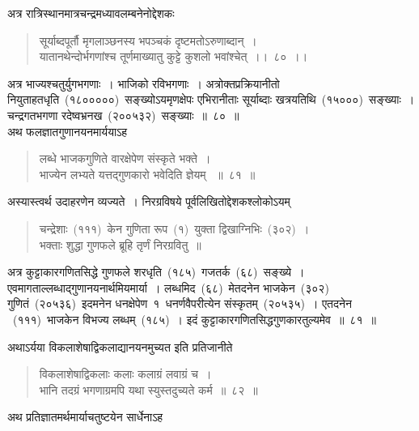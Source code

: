 \documentclass[11pt, openany]{book}
\begin{document}
\indent
अत्र रात्रिस्थानमात्रचन्द्रमध्यावलम्बनेनोद्देशकः\textendash

\begin{quote}
{\ku सूर्याब्दपूर्तौ मृगलाञ्छनस्य भपञ्चकं दृष्टमतोऽरुणाब्दान्~।\\
यातानथेन्दोर्भगणांश्च तूर्णमाख्यातु कुट्टे कुशलो भवांश्चेत्~।।~८०~।।}
\end{quote}

\indent
अत्र भाज्यश्चतुर्युगभगणाः~। भाजिको रविभगणाः~। अत्रोक्तप्रक्रियानीतो नियुताहतधृति~(१८०००००)~सङ्ख्योऽयमृणक्षेपः एभिरानीताः सूर्याब्दाः खत्रयतिथि~(१५०००)~सङ्ख्याः~। चन्द्रगतभगणा रदेष्वभ्रनख~(२००५३२)~सङ्ख्याः~॥~८०~॥\\

\indent
अथ फलज्ञातगुणानयनमार्ययाऽह\textendash

\begin{quote}
{\ks लब्धे भाजकगुणिते वारक्षेपेण संस्कृते भक्ते~।\\
भाज्येन लभ्यते यत्तद्गुणकारो भवेदिति ज्ञेयम् ~॥~८१~॥}
\end{quote}

\indent
अस्यास्त्वर्थ उदाहरणेन व्यज्यते~। निरग्रविषये पूर्वलिखितोद्देशकश्लोकोऽयम्\textendash

\begin{quote}
{\qt चन्द्रेशाः~(१११)~केन गुणिता रूप~(१)~युक्ता द्विखाग्निभिः~(३०२)~।\\
भक्ताः शुद्धा गुणफले ब्रूहि तृर्णं निरग्रवितु~॥}
\end{quote}

\indent
अत्र कुट्टाकारगणितसिद्धे गुणफले शरधृति~(१८५)~गजतर्क~(६८)~सङ्ख्ये~। एवमागताल्लब्धाद्गुणानयनार्थमियमार्या~। लब्धमिद~(६८)~मेतदनेन भाजकेन~(३०२)~ गुणितं~(२०५३६)~इदमनेन धनक्षेपेण~१~धनर्णवैपरीत्येन संस्कृतम्~(२०५३५)~। एतदनेन ~(१११)~भाजकेन विभज्य लब्धम्~(१८५)~। इदं कुट्टाकारगणितसिद्धगुणकारतुल्यमेव~॥~८१~॥

\newpage
\thispagestyle{fancy}
\fancyhf{}

\indent
अथाऽर्यया विकलाशेषाद्विकलाद्यानयनमुच्यत इति प्रतिजानीते\textendash

\begin{quote}
{\ks विकलाशेषाद्विकलाः कलाः कलाग्रं लवाग्रं च~।\\
भानि तदग्रं भगणाग्रमपि यथा स्युस्तदुच्यते कर्म~॥~८२~॥}
\end{quote}

\indent
अथ प्रतिज्ञातमर्थमार्याचतुष्टयेन सार्धेनाऽह\textendash
\end{document}
